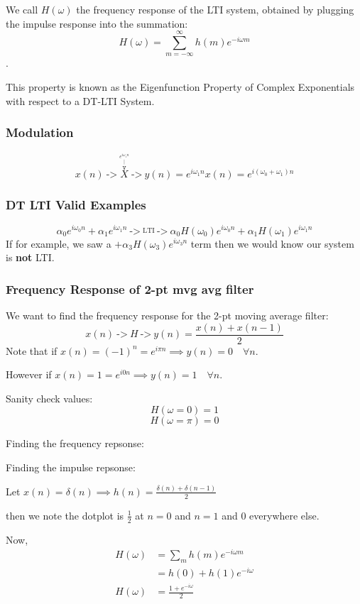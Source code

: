 We call $H(\omega)$ the frequency response of the LTI system, obtained by plugging the impulse response into the summation: $$H(\omega)=\sum_{m=-\infty}^\infty h(m) e^{-i\omega m}$$.

This property is known as the Eigenfunction Property of Complex Exponentials with respect to a DT-LTI System.

\subsubsection{Modulation}
\[
  x(n) \ \texttt{->} \ \stackrel{\stackrel{e^{i\omega_1 n}}{\stackrel{|}{\texttt{v}}}}{\boxed{X}} \ \texttt{->} \ y(n) = e^{i\omega_1 n}x(n) = e^{i(\omega_0+\omega_1) n}
\]

\subsubsection{DT LTI Valid Examples}
\[
    \alpha_0e^{i\omega_0 n}+\alpha_1e^{i\omega_1 n} \ \texttt{->} \ \stackrel{\text{LTI}}{\boxed{\ }} \ \texttt{->} \  \alpha_0H(\omega_0)e^{i\omega_0 n}
    +
    \alpha_1H(\omega_1)e^{i\omega_1 n}
\]
If for example, we saw a $+ \alpha_3H(\omega_3)e^{i\omega_3 n}$ term then we would know our system is \textbf{not} LTI.

\subsubsection{Frequency Response of 2-pt mvg avg filter}
We want to find the frequency response for the 2-pt moving average filter:
\[
    x(n) \ \texttt{->} \ \boxed{H} \ \texttt{->} \ y(n) = \frac{x(n)+x(n-1)}2
\]
Note that if $x(n)=(-1)^n=e^{i\pi n}\implies y(n)=0\quad\forall n$.

However if $x(n)=1=e^{i0n}\implies y(n)=1\quad\forall n$.

Sanity check values:
\[
    H(\omega=0) = 1
\]
\[
    H(\omega=\pi) = 0
\]

Finding the frequency repsonse:
\begin{shaded}
Finding the impulse repsonse:

Let $x(n)=\delta(n) \implies h(n)=\frac{\delta(n)+\delta(n-1)}2$

then we note the dotplot is $\frac12$ at $n=0$ and $n=1$ and $0$ everywhere else.
\end{shaded}
Now,
\begin{align*}
    H(\omega) &= \sum_m h(m) e^{-i\omega m}
    \\
    &= h(0) + h(1) e^{-i\omega}
    \\
    H(\omega) &= \frac{1+e^{-i\omega}}2
\end{align*}

